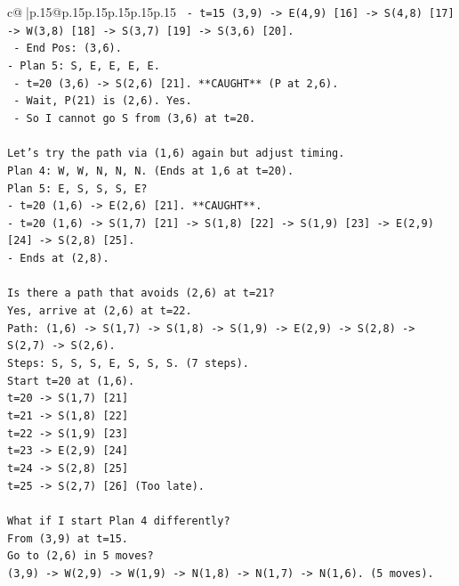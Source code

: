 \documentclass{article}
\begin{document}
{\begin{supertabular}{c@{$\;$}|p{.15\linewidth}@{}p{.15\linewidth}p{.15\linewidth}p{.15\linewidth}p{.15\linewidth}p{.15\linewidth}}
{{{\texttt{  {-} t=15 (3,9) {-}> E(4,9) {[}16{]} {-}> S(4,8) {[}17{]} {-}> W(3,8) {[}18{]} {-}> S(3,7) {[}19{]} {-}> S(3,6) {[}20{]}.} \\
\texttt{  {-} End Pos: (3,6).} \\
\texttt{{-} Plan 5: S, E, E, E, E.} \\
\texttt{  {-} t=20 (3,6) {-}> S(2,6) {[}21{]}. **CAUGHT** (P at 2,6).} \\
\texttt{  {-} Wait, P(21) is (2,6). Yes.} \\
\texttt{  {-} So I cannot go S from (3,6) at t=20.} \\
\\ 
\texttt{Let's try the path via (1,6) again but adjust timing.} \\
\texttt{Plan 4: W, W, N, N, N. (Ends at 1,6 at t=20).} \\
\texttt{Plan 5: E, S, S, S, E?} \\
\texttt{{-} t=20 (1,6) {-}> E(2,6) {[}21{]}. **CAUGHT**.} \\
\texttt{{-} t=20 (1,6) {-}> S(1,7) {[}21{]} {-}> S(1,8) {[}22{]} {-}> S(1,9) {[}23{]} {-}> E(2,9) {[}24{]} {-}> S(2,8) {[}25{]}.} \\
\texttt{{-} Ends at (2,8).} \\
\\ 
\texttt{Is there a path that avoids (2,6) at t=21?} \\
\texttt{Yes, arrive at (2,6) at t=22.} \\
\texttt{Path: (1,6) {-}> S(1,7) {-}> S(1,8) {-}> S(1,9) {-}> E(2,9) {-}> S(2,8) {-}> S(2,7) {-}> S(2,6).} \\
\texttt{Steps: S, S, S, E, S, S, S. (7 steps).} \\
\texttt{Start t=20 at (1,6).} \\
\texttt{t=20 {-}> S(1,7) {[}21{]}} \\
\texttt{t=21 {-}> S(1,8) {[}22{]}} \\
\texttt{t=22 {-}> S(1,9) {[}23{]}} \\
\texttt{t=23 {-}> E(2,9) {[}24{]}} \\
\texttt{t=24 {-}> S(2,8) {[}25{]}} \\
\texttt{t=25 {-}> S(2,7) {[}26{]} (Too late).} \\
\\ 
\texttt{What if I start Plan 4 differently?} \\
\texttt{From (3,9) at t=15.} \\
\texttt{Go to (2,6) in 5 moves?} \\
\texttt{(3,9) {-}> W(2,9) {-}> W(1,9) {-}> N(1,8) {-}> N(1,7) {-}> N(1,6). (5 moves).} \\
}}}
\end{supertabular}}
\end{document}
